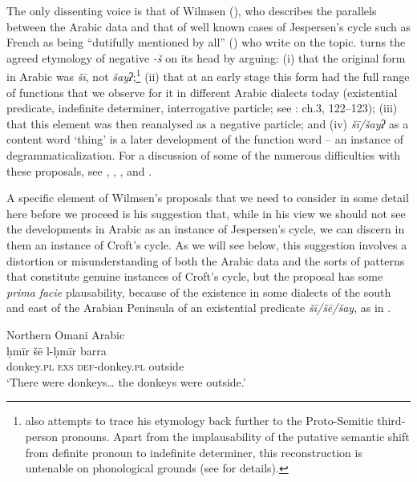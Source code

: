 \documentclass[output=paper]{langsci/langscibook}
\begin{document}
The only dissenting voice is that of Wilmsen (\citeyear{Wilmsen2013,Wilmsen2014}), who describes the parallels between the Arabic data and that of well known cases of Jespersen’s cycle such as French as being “dutifully mentioned by all” (\citeyear[117]{Wilmsen2014}) who write on the topic. \citet{Wilmsen2014} turns the agreed etymology of negative \textit{{}-š} on its head by arguing: (i) that the original form in Arabic was \textit{šī}, not \textit{šayʔ};\footnote{\citet{Wilmsen2014} also attempts to trace his etymology back further to the Proto-Semitic third-person pronouns. Apart from the implausability of the putative semantic shift from definite pronoun to indefinite determiner, this reconstruction is untenable on phonological grounds (see \citealt{Al-Jallad2015review} for details).} (ii) that at an early stage this form had the full range of functions that we observe for it in different Arabic dialects today (existential predicate, indefinite determiner, interrogative particle; see \citealt{Wilmsen2014}: ch.3, 122–123); (iii) that this element was then reanalysed as a negative particle; and (iv) \textit{šī/šayʔ} as a content word ‘thing’ is a later development of the function word – an instance of degrammaticalization. For a discussion of some of the numerous difficulties with these proposals, see \citet{Al-Jallad2015review}, \citet{Pat-El2016}, \citet{Souag2016review}, and \citet{Lucas2018}.

A specific element of Wilmsen’s proposals that we need to consider in some detail here before we proceed is his suggestion that, while in his view we should not see the developments in Arabic as an instance of Jespersen’s cycle, we can discern in them an instance of Croft’s cycle. As we will see below, this suggestion involves a distortion or misunderstanding of both the Arabic data and the sorts of patterns that constitute genuine instances of Croft’s cycle, but the proposal has some \textit{prima} \textit{facie} plausability, because of the existence in some dialects of the south and east of the Arabian Peninsula of an existential predicate \textit{šī/šē/šay}, as in . 


\ea\label{ex:key:oma}
{       Northern Omani Arabic \citep[92]{Eades2009}}\\
\gll ḥmīr šē l-ḥmīr barra\\
     donkey.\textsc{pl} \textsc{exs} \textsc{def-}donkey.\textsc{pl} outside\\
\glt ‘There were donkeys… the donkeys were outside.’
\z
\end{document}
